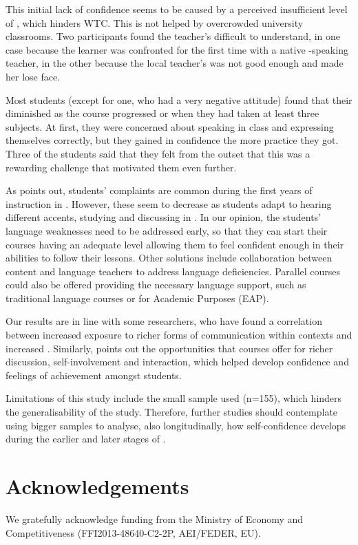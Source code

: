 \documentclass[output=paper]{langsci/langscibook}
\begin{document}
This initial lack of confidence seems to be caused by a perceived insufficient level of , which hinders WTC. This is not helped by overcrowded university classrooms.  Two participants found the teacher’s  difficult to understand, in one case because the learner was confronted for the first time with a native -speaking teacher, in the other because the local teacher’s  was not good enough and made her lose face.


\newpage 
Most students (except for one, who had a very negative attitude) found that their  diminished as the course progressed or when they had taken at least three  subjects. At first, they were concerned about speaking in class and expressing themselves correctly, but they gained in confidence the more practice they got.  Three of the students said that they felt from the outset that this was a rewarding challenge that motivated them even further. 



As \citet{Wilkinson2013} points out, students’ complaints are common during the first years of instruction in . However, these seem to decrease as students adapt to hearing different accents, studying and discussing in . In our opinion, the students’ language weaknesses need to be addressed early, so that they can start their  courses having an adequate  level allowing them to feel confident enough in their  abilities to follow their lessons. Other solutions include collaboration between content and language teachers to address language deficiencies. Parallel courses could also be offered providing the necessary language support, such as traditional language courses or  for Academic Purposes (EAP). 



Our results are in line with some researchers, who have found a correlation between increased exposure to richer forms of communication within  contexts and increased   \citep{Wong2010}. Similarly, \cite{Coyle2013} points out the opportunities that  courses offer for richer discussion, self-involvement and interaction, which helped develop confidence and feelings of achievement amongst students. 



Limitations of this study include the small sample used (n=155), which hinders the generalisability of the study.  Therefore, further studies should contemplate using bigger samples to analyse, also longitudinally, how  self-confidence develops during the earlier and later stages of .  


\section*{Acknowledgements}
We gratefully acknowledge funding from the  Ministry of Economy and Competitiveness (FFI2013-48640-C2-2P, AEI/FEDER, EU). 

 
\sloppy
\printbibliography[heading=subbibliography,notkeyword=this] 
\end{document}
